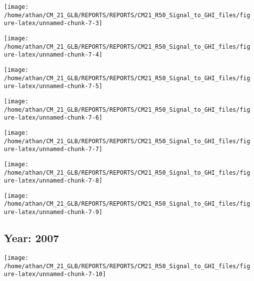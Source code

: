 \documentclass[
  11pt,
  a4paper,oneside]{article}
\begin{document}
\begin{center}\texttt{[image: /home/athan/CM\_21\_GLB/REPORTS/REPORTS/CM21\_R50\_Signal\_to\_GHI\_files/figure-latex/unnamed-chunk-7-3]} \end{center}

\begin{center}\texttt{[image: /home/athan/CM\_21\_GLB/REPORTS/REPORTS/CM21\_R50\_Signal\_to\_GHI\_files/figure-latex/unnamed-chunk-7-4]} \end{center}

\begin{center}\texttt{[image: /home/athan/CM\_21\_GLB/REPORTS/REPORTS/CM21\_R50\_Signal\_to\_GHI\_files/figure-latex/unnamed-chunk-7-5]} \end{center}

\begin{center}\texttt{[image: /home/athan/CM\_21\_GLB/REPORTS/REPORTS/CM21\_R50\_Signal\_to\_GHI\_files/figure-latex/unnamed-chunk-7-6]} \end{center}

\begin{center}\texttt{[image: /home/athan/CM\_21\_GLB/REPORTS/REPORTS/CM21\_R50\_Signal\_to\_GHI\_files/figure-latex/unnamed-chunk-7-7]} \end{center}

\begin{center}\texttt{[image: /home/athan/CM\_21\_GLB/REPORTS/REPORTS/CM21\_R50\_Signal\_to\_GHI\_files/figure-latex/unnamed-chunk-7-8]} \end{center}

\begin{center}\texttt{[image: /home/athan/CM\_21\_GLB/REPORTS/REPORTS/CM21\_R50\_Signal\_to\_GHI\_files/figure-latex/unnamed-chunk-7-9]} \end{center}

\FloatBarrier

\newpage

\hypertarget{year-2007}{%
\subsection{Year: 2007}\label{year-2007}}

\begin{center}\texttt{[image: /home/athan/CM\_21\_GLB/REPORTS/REPORTS/CM21\_R50\_Signal\_to\_GHI\_files/figure-latex/unnamed-chunk-7-10]} \end{center}
\end{document}
